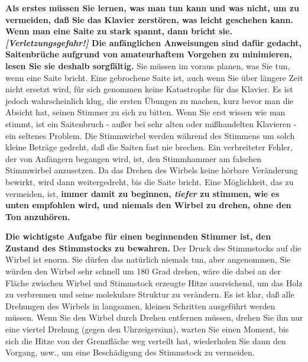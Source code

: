 {\normalsize \textbf{Als erstes müssen Sie lernen, was man tun kann und was nicht, um zu vermeiden, daß Sie das Klavier zerstören, was leicht geschehen kann.
 Wenn man eine Saite zu stark spannt, dann bricht sie.
 \textit{[Verletzungsgefahr!]}
 Die anfänglichen Anweisungen sind dafür gedacht, Saitenbrüche aufgrund von amateurhaftem Vorgehen zu minimieren, lesen Sie sie deshalb sorgfältig.}}
 Sie müssen im voraus planen, was Sie tun, wenn eine Saite bricht.
 Eine gebrochene Saite ist, auch wenn Sie über längere Zeit nicht ersetzt wird, für sich genommen keine Katastrophe für das Klavier.
 Es ist jedoch wahrscheinlich klug, die ersten Übungen zu machen, kurz bevor man die Absicht hat, seinen Stimmer zu sich zu bitten.
 Wenn Sie erst wissen wie man stimmt, ist ein Saitenbruch - außer bei sehr alten oder mißhandelten Klavieren -  ein seltenes Problem.
 Die Stimmwirbel werden während des Stimmens um solch kleine Beträge gedreht, daß die Saiten fast nie brechen.
 Ein verbreiteter Fehler, der von Anfängern begangen wird, ist, den Stimmhammer am falschen Stimmwirbel anzusetzen.
 Da das Drehen des Wirbels keine hörbare Veränderung bewirkt, wird dann weitergedreht, bis die Saite bricht.
 Eine Möglichkeit, das zu vermeiden, ist, {\normalsize \textbf{immer damit zu beginnen, \textit{tiefer} zu stimmen, wie es unten empfohlen wird, und niemals den Wirbel zu drehen, ohne den Ton anzuhören.}}

{\normalsize \textbf{Die wichtigste Aufgabe für einen beginnenden Stimmer ist, den Zustand des Stimmstocks zu bewahren.}}
 Der Druck des Stimmstocks auf die Wirbel ist enorm.
 Sie dürfen das natürlich niemals tun, aber angenommen, Sie würden den Wirbel sehr schnell um 180 Grad drehen, wäre die dabei an der Fläche zwischen Wirbel und Stimmstock erzeugte Hitze ausreichend, um das Holz zu verbrennen und seine molekulare Struktur zu verändern.
 Es ist klar, daß alle Drehungen des Wirbels in langsamen, kleinen Schritten ausgeführt werden müssen.
 Wenn Sie den Wirbel durch Drehen entfernen müssen, drehen Sie ihn nur eine viertel Drehung (gegen den Uhrzeigersinn), warten Sie einen Moment, bis sich die Hitze von der Grenzfläche weg verteilt hat, wiederholen Sie dann den Vorgang, usw., um eine Beschädigung des Stimmstock zu vermeiden.
 

